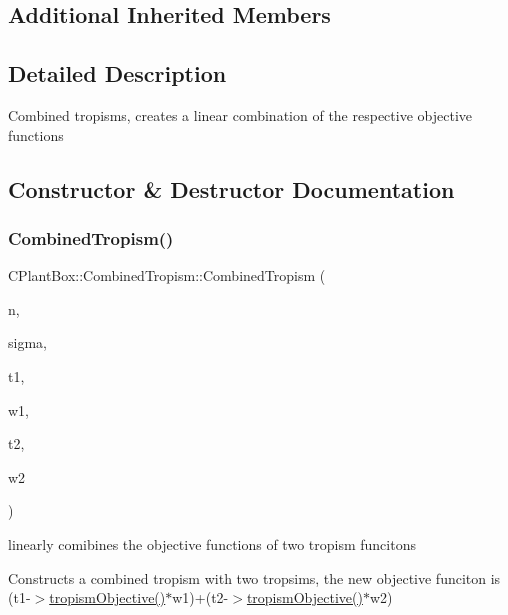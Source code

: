 \subsection*{Additional Inherited Members}


\subsection{Detailed Description}
Combined tropisms, creates a linear combination of the respective objective functions 

\subsection{Constructor \& Destructor Documentation}
\mbox{\label{classCPlantBox_1_1CombinedTropism_a5c02c15e17677871efaa7b8cfbc6c9b6}} 
\subsubsection{\texorpdfstring{Combined\+Tropism()}{CombinedTropism()}}
{\footnotesize\ttfamily C\+Plant\+Box\+::\+Combined\+Tropism\+::\+Combined\+Tropism (\begin{DoxyParamCaption}\item[{double}]{n,  }\item[{double}]{sigma,  }\item[{\hyperlink{classCPlantBox_1_1TropismFunction}{Tropism\+Function} $\ast$}]{t1,  }\item[{double}]{w1,  }\item[{\hyperlink{classCPlantBox_1_1TropismFunction}{Tropism\+Function} $\ast$}]{t2,  }\item[{double}]{w2 }\end{DoxyParamCaption})}



linearly comibines the objective functions of two tropism funcitons 

Constructs a combined tropism with two tropsims, the new objective funciton is (t1-\/$>$\hyperlink{classCPlantBox_1_1CombinedTropism_a9ed761842ac79d92c15f9a88fc2df995}{tropism\+Objective()}$\ast$w1)+(t2-\/$>$\hyperlink{classCPlantBox_1_1CombinedTropism_a9ed761842ac79d92c15f9a88fc2df995}{tropism\+Objective()}$\ast$w2)


